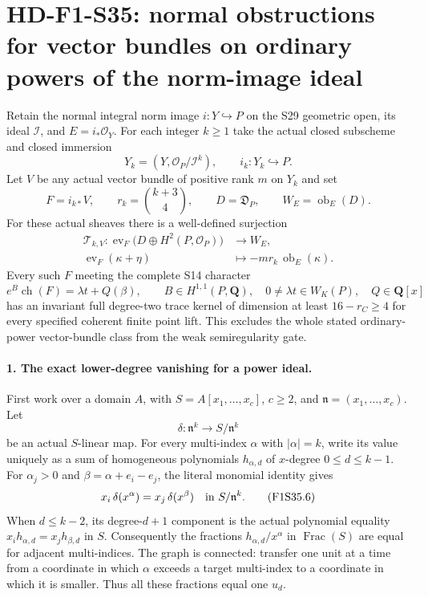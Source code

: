 \section[HD-F1-S35: ordinary-power thickenings]{HD-F1-S35: normal obstructions for vector bundles on ordinary powers of the norm-image ideal}
\label{sec:f1-norm-fourfold-ordinary-powers}

Retain the normal integral norm image
$i:Y\hookrightarrow P$ on the S29 geometric open,
its ideal $\mathcal I$, and
$E=i_*\mathcal O_Y$.
For each integer $k\ge1$ take the actual closed
subscheme and closed immersion
\[
 Y_k=(Y,\mathcal O_P/\mathcal I^k),
 \qquad i_k:Y_k\hookrightarrow P.
 \tag{F1S35.1}
\]
Let $V$ be any actual vector bundle of positive
rank $m$ on $Y_k$ and set
\[
 F=i_{k*}V,\qquad
 r_k=\binom{k+3}{4},\qquad
 D=\mathfrak D_P,\qquad W_E=\operatorname{ob}_E(D).
 \tag{F1S35.2}
\]
For these actual sheaves there is a well-defined
surjection
\[
\begin{split}
 \mathcal T_{k,V}:
 \operatorname{ev}_F\bigl(D\oplus H^2(P,\mathcal O_P)\bigr)
     &\longrightarrow W_E,\\
 \operatorname{ev}_F(\kappa+\eta)
     &\longmapsto -m r_k\,\operatorname{ob}_E(\kappa).
\end{split}
 \tag{F1S35.3}
\]
Every such $F$ meeting the complete S14 character
\[
 e^B\operatorname{ch}(F)=\lambda t+Q(\beta),
 \qquad B\in H^{1,1}(P,\mathbf Q),\quad
 0\ne\lambda t\in W_K(P),\quad Q\in\mathbf Q[x]
 \tag{F1S35.4}
\]
has an invariant full degree-two trace kernel of
dimension at least $16-r_C\ge4$ for every specified
coherent finite point lift. This excludes the
whole stated ordinary-power vector-bundle class
from the weak semiregularity gate.

\paragraph{1. The exact lower-degree vanishing for a power ideal.}
First work over a domain $A$, with
$S=A[x_1,\ldots,x_c]$, $c\ge2$, and
$\mathfrak n=(x_1,\ldots,x_c)$.
Let
\[
             \delta:\mathfrak n^k\longrightarrow
                                      S/\mathfrak n^k
 \tag{F1S35.5}
\]
be an actual $S$-linear map.
For every multi-index $\alpha$ with $|\alpha|=k$,
write its value uniquely as a sum of homogeneous
polynomials $h_{\alpha,d}$ of $x$-degree
$0\le d\le k-1$.
For $\alpha_j>0$ and
$\beta=\alpha+e_i-e_j$, the literal monomial
identity gives
\[
 x_i\,\delta(x^\alpha)
      =x_j\,\delta(x^\beta)
                    \quad\hbox{in }S/\mathfrak n^k.
 \tag{F1S35.6}
\]
When $d\le k-2$, its degree-$d+1$ component is
the actual polynomial equality
$x_i h_{\alpha,d}=x_j h_{\beta,d}$ in $S$.
Consequently the fractions
$h_{\alpha,d}/x^\alpha$ in $\operatorname{Frac}(S)$
are equal for adjacent multi-indices.
The graph is connected: transfer one unit at a
time from a coordinate in which $\alpha$ exceeds
a target multi-index to a coordinate in which it
is smaller. Thus all these fractions equal
one $u_d$.

